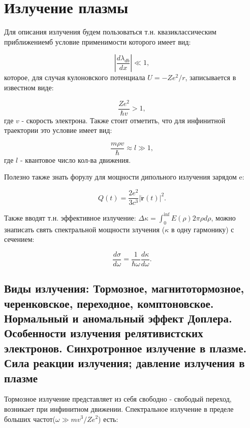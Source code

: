 \documentclass[10pt, a4paper]{article}
\numberwithin{equation}{section}
\begin{document}
\section{Излучение плазмы}

Для описания излучения будем пользоваться т.н. квазиклассическим приближениемб условие применимости которого имеет вид:

\begin{equation}
    |\frac{d \lambda_{db}}{dx}|\ll 1,
\end{equation}
которое, для случая кулоновского потенциала $U=-Ze^2/r$, записывается в известном виде:

\begin{equation}
    \frac{Ze^2}{\hbar v} > 1,
\end{equation}
где $v$ - скорость электрона. Также стоит отметить, что для инфинитной траектории это условие имеет вид:

\begin{equation}
    \frac{m \rho v}{\hbar} \approx l \gg 1,
\end{equation}
где $l$ - квантовое число кол-ва движения.

Полезно также знать форулу для мощности дипольного излучения зарядом e:

\begin{equation}
    Q(t) = \frac{2e^2}{3c^3}|\ddot{\mathbf{r}}(t)|^2.
\end{equation}

Также вводят т.н. эффективное излучение: $\Delta \kappa = \int_0^{\inf} E(\rho) 2\pi \rho d\rho$, можно знаписать свять
спектральной мощности злучения ($\kappa$ в одну гармонику) с сечением:

\begin{equation}
    \frac{d\sigma}{d\omega}=\frac{1}{\hbar\omega} \frac{d\kappa}{d\omega}.
\end{equation}

\subsection{Виды излучения: Тормозное, магнитотормозное, черенковское, переходное, комптоновское. Нормальный и аномальный эффект Доплера. Особенности излучения релятивистских электронов. Синхротронное излучение в плазме. Сила реакции излучения; давление излучения в плазме}
Тормозное излучение представляет из себя свободно - свободый переход, возникает при инфинитном движении. 
Спектральное излучение в пределе больших частот($\omega \gg mv^3/Ze^2$) есть:
\end{document}
